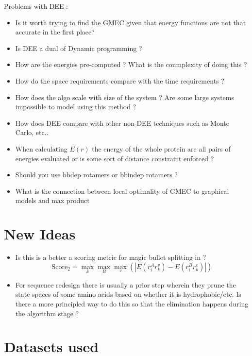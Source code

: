 \documentclass{article}
\begin{document}
Problems with DEE :
\begin{itemize}
\item Is it worth trying to find the GMEC given that energy functions are not that accurate in the first place?
\item Is DEE a dual of Dynamic programming ? 
\item How are the energies pre-computed ? What is the conmplexity of doing this ?
\item How do the space requirements compare with the time requirements ?
\item How does the algo scale with size of the system ? Are some large systems impossible to model using this method ? 
\item How does DEE compare with other non-DEE techniques such as Monte Carlo, etc..
\item When calculating $E(r)$ the energy of the whole protein are all pairs of energies evaluated or is some sort of distance constraint enforced ?
\item Should you use bbdep rotamers or bbindep rotamers ?
\item What is the connection between local optimality of GMEC to graphical models and max product
\end{itemize}

\section{New Ideas}

\begin{itemize}
\item Is this is a better a scoring metric for magic bullet splitting in  \cite{Pierce2000} ? 
\[
\text{Score}_2 = \max_k \max_B \max_v \left( \left| E(r_i^Ar_k^v) - E(r_i^Br_k^v) \right| \right)
\]
\item For sequence redesign there is usually a prior step wherein they prune the state spaces of some amino acids based on whether it is hydrophobic/etc. Is there a more principled way to do this so that the elimination happens during the algorithm stage ?
\end{itemize}




\pagebreak
\newpage

\appendix


\section{Datasets used}
\end{document}
